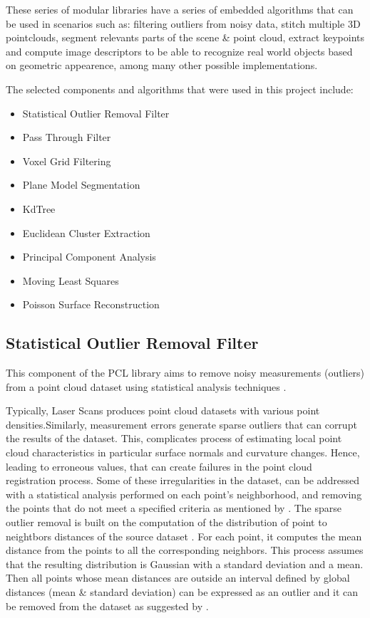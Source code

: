\documentclass[12pt]{report}
\begin{document}
These series of modular libraries  have a series of embedded algorithms  that can be used in scenarios such as: filtering outliers from noisy data, stitch multiple 3D pointclouds,
segment relevants parts of the scene \& point cloud, extract keypoints and compute image descriptors to be able to recognize real world objects based on geometric appearence, among many other possible implementations.

The selected components and algorithms that were used in this project include: 

\begin{itemize}
  \item Statistical Outlier Removal Filter
  \item Pass Through Filter
  \item Voxel Grid Filtering
  \item Plane Model Segmentation
  \item KdTree
  \item Euclidean Cluster Extraction
  \item Principal Component Analysis
  \item Moving Least Squares
  \item Poisson Surface Reconstruction 
\end{itemize}


\subsection{Statistical Outlier Removal Filter}

This component of the PCL library aims to remove noisy measurements (outliers) from a point cloud dataset using statistical analysis techniques .

Typically, Laser Scans produces point cloud datasets with various point densities.Similarly, measurement errors generate sparse outliers that can corrupt the results of the dataset.
This, complicates process of estimating local point cloud characteristics in particular surface normals and curvature changes. Hence, leading to erroneous values, that can create failures in the point cloud registration process.
Some of these irregularities in the dataset, can be addressed with a statistical analysis performed on each point's neighborhood, and removing the points that do not meet a specified criteria as mentioned by .
The sparse outlier removal is built on  the computation of the distribution  of point to neightbors distances of the source dataset .
For each point, it computes the mean distance from the points to all the corresponding neighbors. This process assumes that the resulting distribution is Gaussian with a standard deviation and a mean.
Then all points whose mean distances are outside an interval defined by global distances (mean \& standard deviation) can be expressed as an outlier and it can be removed from the dataset as suggested by .
\end{document}
